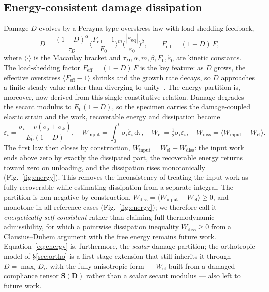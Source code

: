 \documentclass[sn-basic]{sn-jnl}
\newcommand{\epsd}{\dot{\varepsilon}}
\begin{document}
\subsection{Energy-consistent damage dissipation}\label{sec:energy}

Damage $D$ evolves by a Perzyna-type overstress law with load-shedding feedback,
\begin{equation}
\dot D=\frac{(1-D)^{\alpha}}{\tau_D}
\Big\langle\frac{F_{\mathrm{eff}}-1}{F_0}\Big\rangle^{m}
\Big(\frac{|\epsd_{\mathrm{eq}}|}{\epsd_0}\Big)^{\beta},
\qquad F_{\mathrm{eff}}=(1-D)\,F,
\label{eq:damage}
\end{equation}
where $\langle\cdot\rangle$ is the Macaulay bracket and
$\tau_D,\alpha,m,\beta,F_0,\epsd_0$ are kinetic constants. The load-shedding
factor $F_{\mathrm{eff}}=(1-D)\,F$ is the key feature: as $D$ grows, the effective
overstress $\langle F_{\mathrm{eff}}-1\rangle$ shrinks and the growth rate decays,
so $D$ approaches a finite steady value rather than diverging to
unity~\citep{perzyna1966,lemaitre1985}. The energy partition is, moreover, now
derived from this single constitutive relation. Damage degrades the secant modulus to $E_0(1-D)$, so the specimen
carries the damage-coupled elastic strain and the work, recoverable energy and
dissipation become
\begin{equation}
\varepsilon_i=\frac{\sigma_i-\nu(\sigma_j+\sigma_k)}{E_0(1-D)},\quad
W_{\mathrm{input}}=\!\int_0^t\!\sigma_i\dot\varepsilon_i\,\mathrm{d}\tau,\quad
W_{\mathrm{el}}=\tfrac12\sigma_i\varepsilon_i,\quad
W_{\mathrm{diss}}=\big\langle W_{\mathrm{input}}-W_{\mathrm{el}}\big\rangle .
\label{eq:energy}
\end{equation}
The first law then closes by construction,
$W_{\mathrm{input}}=W_{\mathrm{el}}+W_{\mathrm{diss}}$: the input work ends above
zero by exactly the dissipated part, the recoverable energy returns toward zero on
unloading, and the dissipation rises monotonically (Fig.~\ref{fig:energy}). This
removes the inconsistency of treating the input work as fully recoverable while
estimating dissipation from a separate integral. The partition is non-negative by
construction, $W_{\mathrm{diss}}=\langle W_{\mathrm{input}}-W_{\mathrm{el}}\rangle\ge0$,
and monotone in all reference cases (Fig.~\ref{fig:energy}); we therefore call it
\emph{energetically self-consistent} rather than claiming full thermodynamic
admissibility, for which a pointwise dissipation inequality
$\dot W_{\mathrm{diss}}\ge0$ from a Clausius--Duhem argument with the free energy
remains future work. Equation~\eqref{eq:energy} is, furthermore, the
\emph{scalar}-damage partition; the orthotropic model of \S\ref{sec:ortho} is a
first-stage extension that still inherits it through $D=\max_i D_i$, with the
fully anisotropic form --- $W_{\mathrm{el}}$ built from a damaged compliance
tensor $\mathbf{S}(\mathbf{D})$ rather than a scalar secant modulus --- also left
to future work.
\end{document}

